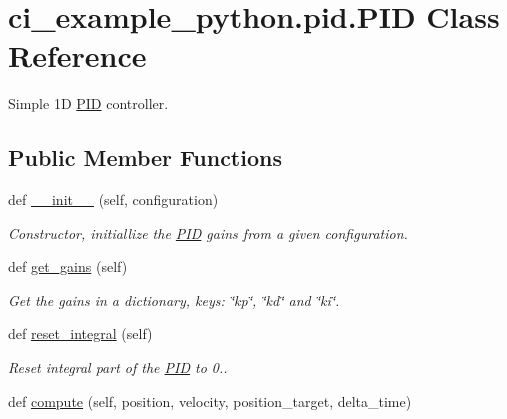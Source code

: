\hypertarget{classci__example__python_1_1pid_1_1PID}{}\section{ci\+\_\+example\+\_\+python.\+pid.\+P\+ID Class Reference}
\label{classci__example__python_1_1pid_1_1PID}


Simple 1D \hyperlink{classci__example__python_1_1pid_1_1PID}{P\+ID} controller.  


\subsection*{Public Member Functions}
\begin{DoxyCompactItemize}
\item 
def \hyperlink{classci__example__python_1_1pid_1_1PID_a904d0150a78efa3d5a3b7483aa310776}{\+\_\+\+\_\+init\+\_\+\+\_\+} (self, configuration)
\begin{DoxyCompactList}\small\item\em Constructor, initiallize the \hyperlink{classci__example__python_1_1pid_1_1PID}{P\+ID} gains from a given configuration. \end{DoxyCompactList}\item 
def \hyperlink{classci__example__python_1_1pid_1_1PID_a5810a7e3cf5db4ab2752e5d1502be766}{get\+\_\+gains} (self)
\begin{DoxyCompactList}\small\item\em Get the gains in a dictionary, keys\+: \char`\"{}kp\char`\"{}, \char`\"{}kd\char`\"{} and \char`\"{}ki\char`\"{}. \end{DoxyCompactList}\item 
\mbox{\label{classci__example__python_1_1pid_1_1PID_a8958d8b988959214b187539939030baa}} 
def \hyperlink{classci__example__python_1_1pid_1_1PID_a8958d8b988959214b187539939030baa}{reset\+\_\+integral} (self)
\begin{DoxyCompactList}\small\item\em Reset integral part of the \hyperlink{classci__example__python_1_1pid_1_1PID}{P\+ID} to 0.. \end{DoxyCompactList}\item 
def \hyperlink{classci__example__python_1_1pid_1_1PID_aca3a513839029dd9cd7f46cff130c4ab}{compute} (self, position, velocity, position\+\_\+target, delta\+\_\+time)

\end{DoxyCompactItemize}
